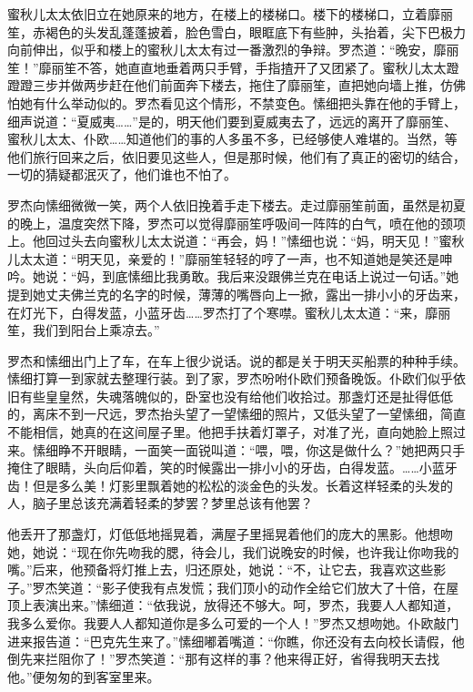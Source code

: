 \par 蜜秋儿太太依旧立在她原来的地方，在楼上的楼梯口。楼下的楼梯口，立着靡丽笙，赤褐色的头发乱蓬蓬披着，脸色雪白，眼眶底下有些肿，头抬着，尖下巴极力向前伸出，似乎和楼上的蜜秋儿太太有过一番激烈的争辩。罗杰道：“晚安，靡丽笙！”靡丽笙不答，她直直地垂着两只手臂，手指揸开了又团紧了。蜜秋儿太太蹬蹬蹬三步并做两步赶在他们前面奔下楼去，拖住了靡丽笙，直把她向墙上推，仿佛怕她有什么举动似的。罗杰看见这个情形，不禁变色。愫细把头靠在他的手臂上，细声说道：“夏威夷……”是的，明天他们要到夏威夷去了，远远的离开了靡丽笙、蜜秋儿太太、仆欧……知道他们的事的人多虽不多，已经够使人难堪的。当然，等他们旅行回来之后，依旧要见这些人，但是那时候，他们有了真正的密切的结合，一切的猜疑都泯灭了，他们谁也不怕了。
\par 罗杰向愫细微微一笑，两个人依旧挽着手走下楼去。走过靡丽笙前面，虽然是初夏的晚上，温度突然下降，罗杰可以觉得靡丽笙呼吸间一阵阵的白气，喷在他的颈项上。他回过头去向蜜秋儿太太说道：“再会，妈！”愫细也说：“妈，明天见！”蜜秋儿太太道：“明天见，亲爱的！”靡丽笙轻轻的哼了一声，也不知道她是笑还是呻吟。她说：“妈，到底愫细比我勇敢。我后来没跟佛兰克在电话上说过一句话。”她提到她丈夫佛兰克的名字的时候，薄薄的嘴唇向上一掀，露出一排小小的牙齿来，在灯光下，白得发蓝，小蓝牙齿……罗杰打了个寒噤。蜜秋儿太太道：“来，靡丽笙，我们到阳台上乘凉去。”
\par 罗杰和愫细出门上了车，在车上很少说话。说的都是关于明天买船票的种种手续。愫细打算一到家就去整理行装。到了家，罗杰吩咐仆欧们预备晚饭。仆欧们似乎依旧有些皇皇然，失魂落魄似的，卧室也没有给他们收拾过。那盏灯还是扯得低低的，离床不到一尺远，罗杰抬头望了一望愫细的照片，又低头望了一望愫细，简直不能相信，她真的在这间屋子里。他把手扶着灯罩子，对准了光，直向她脸上照过来。愫细睁不开眼睛，一面笑一面锐叫道：“喂，喂，你这是做什么？”她把两只手掩住了眼睛，头向后仰着，笑的时候露出一排小小的牙齿，白得发蓝。……小蓝牙齿！但是多么美！灯影里飘着她的松松的淡金色的头发。长着这样轻柔的头发的人，脑子里总该充满着轻柔的梦罢？梦里总该有他罢？
\par 他丢开了那盏灯，灯低低地摇晃着，满屋子里摇晃着他们的庞大的黑影。他想吻她，她说：“现在你先吻我的腮，待会儿，我们说晚安的时候，也许我让你吻我的嘴。”后来，他预备将灯推上去，归还原处，她说：“不，让它去，我喜欢这些影子。”罗杰笑道：“影子使我有点发慌；我们顶小的动作全给它们放大了十倍，在屋顶上表演出来。”愫细道：“依我说，放得还不够大。呵，罗杰，我要人人都知道，我多么爱你。我要人人都知道你是多么可爱的一个人！”罗杰又想吻她。仆欧敲门进来报告道：“巴克先生来了。”愫细嘟着嘴道：“你瞧，你还没有去向校长请假，他倒先来拦阻你了！”罗杰笑道：“那有这样的事？他来得正好，省得我明天去找他。”便匆匆的到客室里来。
